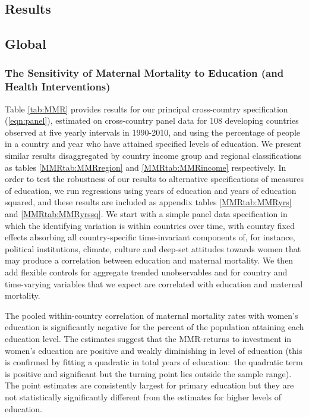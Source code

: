 \documentclass{article}[12pt,subeqn]
\begin{document}
\begin{spacing}{1.4}

\section{Results}
\subsection{Global}
\subsubsection{The Sensitivity of Maternal Mortality to Education (and Health 
Interventions)}
Table \ref{tab:MMR} provides results for our principal cross-country specification 
(\ref{eqn:panel}), estimated on cross-country panel data for 108 developing 
countries observed at five yearly intervals in 1990-2010, and using the percentage 
of people in a country and year who have attained specified levels of education. 
We present similar results disaggregated by country income group and regional 
classifications as tables \ref{MMRtab:MMRregion} and \ref{MMRtab:MMRincome} 
respectively. In order to test the robustness of our results to alternative 
specifications of measures of education, we run regressions using years of 
education and years of education squared, and these results are included as 
appendix tables \ref{MMRtab:MMRyrs} and \ref{MMRtab:MMRyrssq}. We start with a 
simple panel data specification in which the identifying variation is within 
countries over time, with country fixed effects absorbing all country-specific 
time-invariant components of, for instance, political institutions, climate, 
culture and deep-set attitudes towards women that may produce a correlation 
between education and maternal mortality. We then add flexible controls for 
aggregate trended unobservables and for country and time-varying variables that 
we expect are correlated with education and maternal mortality.

The pooled within-country correlation of maternal mortality rates with women's 
education is significantly negative for the percent of the population attaining 
each education level. The estimates suggest that the MMR-returns to investment 
in women's education are positive and weakly diminishing in level of education
(this is confirmed by fitting a quadratic in total years of education:\ the 
quadratic term is positive and significant but the turning point lies outside 
the sample range). The point estimates are consistently largest for primary 
education but they are not statistically significantly different from the 
estimates for higher levels of education.


\end{spacing}
\end{document}

